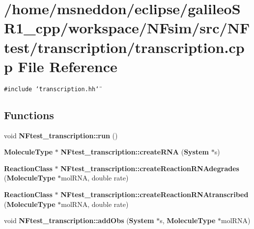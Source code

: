 \section{/home/msneddon/eclipse/galileoSR1\_\-cpp/workspace/NFsim/src/NFtest/transcription/transcription.cpp File Reference}
\label{transcription_8cpp}


{\tt \#include \char`\"{}transcription.hh\char`\"{}}\par
\subsection*{Functions}
\begin{CompactItemize}
\item 
void {\bf NFtest\_\-transcription::run} ()
\item 
{\bf MoleculeType} $\ast$ {\bf NFtest\_\-transcription::createRNA} ({\bf System} $\ast$s)
\item 
{\bf ReactionClass} $\ast$ {\bf NFtest\_\-transcription::createReactionRNAdegrades} ({\bf MoleculeType} $\ast$molRNA, double rate)
\item 
{\bf ReactionClass} $\ast$ {\bf NFtest\_\-transcription::createReactionRNAtranscribed} ({\bf MoleculeType} $\ast$molRNA, double rate)
\item 
void {\bf NFtest\_\-transcription::addObs} ({\bf System} $\ast$s, {\bf MoleculeType} $\ast$molRNA)
\end{CompactItemize}
